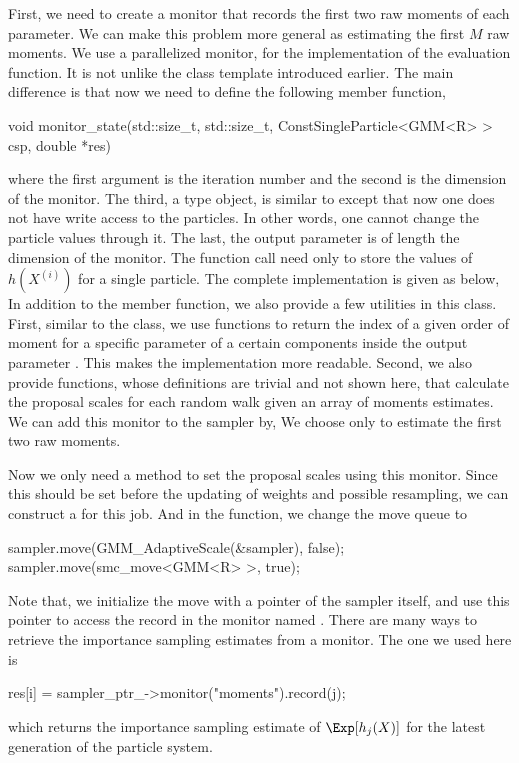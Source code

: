 First, we need to create a monitor that records the first two raw moments of
each parameter. We can make this problem more general as estimating the first
$M$ raw moments. We use a parallelized monitor,  for
the implementation of the evaluation function. It is not unlike the
 class template introduced earlier. The main difference is
that now we need to define the following member function,
\begin{cppcode}
void monitor_state(std::size_t, std::size_t,
        ConstSingleParticle<GMM<R> > csp, double *res)
\end{cppcode}
where the first argument is the iteration number and the second is the
dimension of the monitor. The third, a  type
object, is similar to  except that now one does not
have write access to the particles. In other words, one cannot change the
particle values through it. The last, the output parameter  is
of length the dimension of the monitor. The function call need only to store
the values of $h(X^{(i)})$ for a single particle. The complete implementation
is given as below,
In addition to the  member function, we also provide
a few utilities in this class. First, similar to the  class, we
use functions to return the index of a given order of moment for a specific
parameter of a certain components inside the output parameter .
This makes the implementation more readable. Second, we also provide
functions, whose definitions are trivial and not shown here, that calculate
the proposal scales for each random walk given an array of moments estimates.
We can add this monitor to the sampler by,
We choose only to estimate the first two raw moments.

Now we only need a method to set the proposal scales using this monitor. Since
this should be set before the updating of weights and possible resampling, we
can construct a  for this job.
And in the  function, we change the move queue to
\begin{cppcode}
sampler.move(GMM_AdaptiveScale(&sampler), false);
sampler.move(smc_move<GMM<R> >, true);
\end{cppcode}
Note that, we initialize the move with a pointer of the sampler itself, and
use this pointer to access the record in the monitor named
. There are many ways to retrieve the importance sampling
estimates from a monitor. The one we used here is
\begin{cppcode}
res[i] = sampler_ptr_->monitor("moments").record(j);
\end{cppcode}
which returns the importance sampling estimate of $\Exp[h_j(X)]$ for the latest
generation of the particle system.

